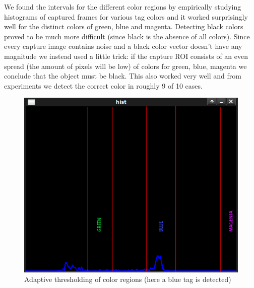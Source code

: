 We found the intervals for the different color regions by empirically studying histograms of captured frames for various tag colors and it worked surprisingly well for the distinct colors of green, blue and magenta. Detecting black colors proved to be much more difficult (since black is the absence of all colors). Since every capture image contains noise and a black color vector doesn't have any magnitude we instead used a little trick: if the capture ROI consists of an even spread (the amount of pixels will be low) of colors for green, blue, magenta we conclude that the object must be black. This also worked very well and from experiments we detect the correct color in roughly 9 of 10 cases.

\begin{figure}[h]
\label{fig:histogram}
    \begin{centering}
   	 \includegraphics[scale=0.7]{figures/histogram.png}
   	 \caption{Adaptive thresholding of color regions (here a blue tag is detected)}\label{fig:histogram}
    \end{centering}
\end{figure}
